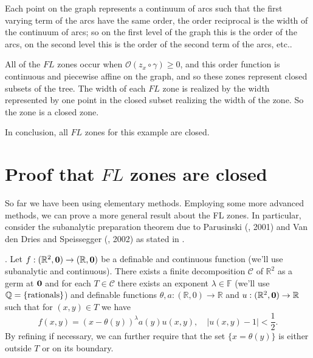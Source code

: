 \documentclass[article]{amsart}
\newcommand{\R}{\mathbb R}
\newcommand{\0}{{\bf 0}}
\begin{document}
%

Each point on the graph represents a continuum of arcs such that the first varying term of the arcs have the same order, the order reciprocal is the width of the continuum of arcs; so on the first level of the graph this is the order of the arcs, on the second level this is the order of the second term of the arcs, etc.. 

All of the $FL$ zones occur when $\mathcal{O}(z_x\circ \gamma) \ge 0$, and this order function is continuous and piecewise affine on the graph, and so these zones  represent closed subsets of the tree.  The width of each $FL$ zone is realized by the width represented by one point in the closed subset realizing the width of the zone.  So the zone is a closed zone. 

In conclusion, all $FL$ zones for this example are closed.  

\section{Proof that $FL$ zones are closed}
So far we have been using elementary methods.  Employing some more advanced methods, we can prove a more general result about the FL zones.  In particular, consider the subanalytic preparation theorem due  to Parusinski (\cite{P}, 2001) and Van den Dries and Speissegger (\cite{VS}, 2002) as stated in \cite{BFGG}.

\smallskip


.  Let $f:( \R^2,\bf{0}) \rightarrow (\R, 0)$ be a definable and continuous function (we'll use subanalytic and continuous).  There exists a finite decomposition  $\mathcal{C}$ of $\R^2$ as a germ at $\bf{0}$ and for each $T \in \mathcal{C}$ there exists an exponent $\lambda \in \mathbb{F}$ (we'll use $\mathbb{Q} = \{ {\rm rationals} \}$) and definable functions $\theta, a: (\R, 0) \rightarrow \R$ and $u:(\R^2, \0) \rightarrow \R$ such that for $(x, y)\in T$ we have
$$
f(x,y) = (x - \theta(y))^\lambda a(y)u(x,y),\quad  | u(x, y) - 1 |  < \frac{1}{2}.
$$
By refining if necessary, we can further require that the set $\{ x = \theta(y) \}$ is either outside $T$ or on its boundary.
\end{document}
